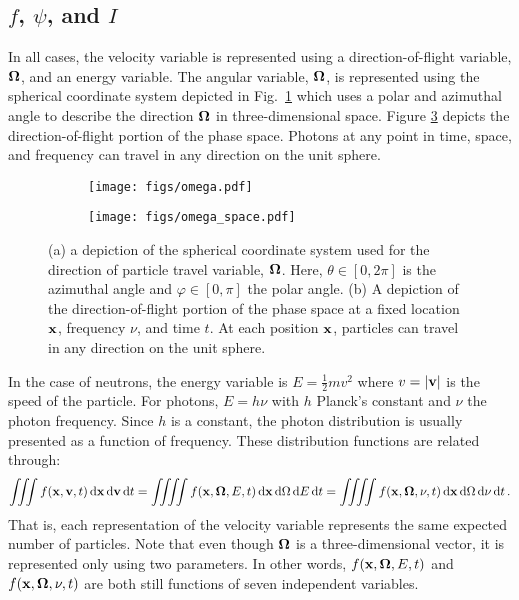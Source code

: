 \documentclass[../doc.tex]{subfiles}
\begin{document}
\subsection{$f$, $\psi$, and $I$}
In all cases, the velocity variable is represented using a direction-of-flight variable, $\boldsymbol{\Omega}$, and an energy variable. 
The angular variable, $\boldsymbol{\Omega}$, is represented using the spherical coordinate system depicted in Fig.~\ref{trans:spherical_coords} which uses a polar and azimuthal angle to describe the direction $\boldsymbol{\Omega}$ in three-dimensional space. Figure \ref{trans:omega_phase} depicts the direction-of-flight portion of the phase space. Photons at any point in time, space, and frequency can travel in any direction on the unit sphere. 
\begin{figure}
\centering
\begin{subfigure}{.49\textwidth}
	\centering
	\texttt{[image: figs/omega.pdf]}
	\caption{}
	\label{trans:spherical_coords}
\end{subfigure}
\begin{subfigure}{.49\textwidth}
	\centering
	\texttt{[image: figs/omega\_space.pdf]}
	\caption{}
	\label{trans:omega_phase}
\end{subfigure}
\caption{(a) a depiction of the spherical coordinate system used for the direction of particle travel variable, $\boldsymbol{\Omega}$. Here, $\theta \in [0,2\pi]$ is the azimuthal angle and $\varphi \in [0,\pi]$ the polar angle. (b) A depiction of the direction-of-flight portion of the phase space at a fixed location $\boldsymbol{\mathrm{x}}$, frequency $\nu$, and time $t$. At each position $\boldsymbol{\mathrm{x}}$, particles can travel in any direction on the unit sphere.}
\end{figure}

In the case of neutrons, the energy variable is $E = \frac{1}{2}mv^2$ where $v = |\boldsymbol{\mathrm{v}}|$ is the speed of the particle. For photons, $E = h\nu$ with $h$ Planck's constant and $\nu$ the photon frequency. Since $h$ is a constant, the photon distribution is usually presented as a function of frequency. These distribution functions are related through: 
	\begin{equation}
		\iiint f(\x,\v,t) \ud \x \ud \v \ud t = \iiiint f(\x,\Omegahat,E,t) \ud \x \ud \Omega \ud E \ud t = \iiiint f(\x,\Omegahat,\nu,t) \ud \x \ud \Omega \ud \nu \ud t \,. 
	\end{equation}
That is, each representation of the velocity variable represents the same expected number of particles. 
Note that even though $\boldsymbol{\Omega}$ is a three-dimensional vector, it is represented only using two parameters. In other words, $f(\boldsymbol{\mathrm{x}},\boldsymbol{\Omega},E,t)$ and $f(\boldsymbol{\mathrm{x}},\boldsymbol{\Omega},\nu,t)$ are both still functions of seven independent variables. 
\end{document}
